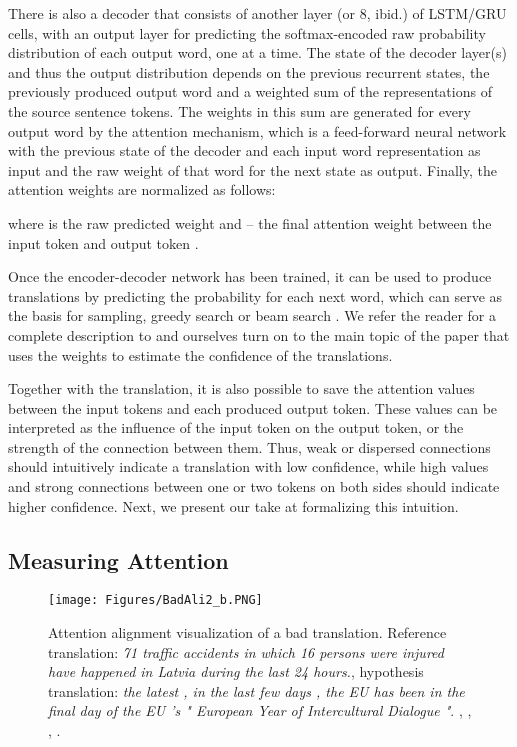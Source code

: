 \documentclass[]{article}
\begin{document}
There is also a decoder that consists of another layer (or 8, ibid.) of LSTM/GRU cells, with an output layer for predicting the softmax-encoded raw probability distribution of each output word, one at a time. The state of the decoder layer(s) and thus the output distribution depends on the previous recurrent states, the previously produced output word and a weighted sum of the representations of the source sentence tokens. The weights in this sum are generated for every output word by the attention mechanism, which is a feed-forward neural network with the previous state of the decoder and each input word representation as input and the raw weight of that word for the next state as output. Finally, the attention weights are normalized as follows:

where  is the raw predicted weight and  -- the final attention weight between the input token  and output token .

Once the encoder-decoder network has been trained, it can be used to produce translations by predicting the probability for each next word, which can serve as the basis for sampling, greedy search or beam search \citep{sennrich2017nematus}. We refer the reader for a complete description to \citep{DBLP:journals/corr/BahdanauCB14} and ourselves turn on to the main topic of the paper that uses the weights  to estimate the confidence of the translations.

Together with the translation, it is also possible to save the attention values between the input tokens and each produced output token. These values can be interpreted as the influence of the input token on the output token, or the strength of the connection between them. Thus, weak or dispersed connections should intuitively indicate a translation with low confidence, while high values and strong connections between one or two tokens on both sides should indicate higher confidence. Next, we present our take at formalizing this intuition.

\subsection{Measuring Attention}

\begin{figure*}[t]
  \texttt{[image: Figures/BadAli2\_b.PNG]}
  \caption{Attention alignment visualization of a bad translation. Reference translation: \emph{71 traffic accidents in which 16 persons were injured have happened in Latvia during the last 24 hours.}, hypothesis translation: \emph{the latest , in the last few days , the EU has been in the final day of the EU 's " European Year of Intercultural Dialogue "}. , , , .}
  \label{fig:bad-attention}
\end{figure*}
\end{document}
